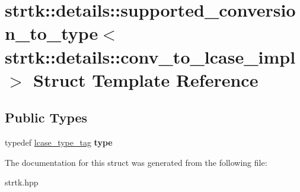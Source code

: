 \hypertarget{structstrtk_1_1details_1_1supported__conversion__to__type_3_01strtk_1_1details_1_1conv__to__lcase__impl_01_4}{\section{strtk\-:\-:details\-:\-:supported\-\_\-conversion\-\_\-to\-\_\-type$<$ strtk\-:\-:details\-:\-:conv\-\_\-to\-\_\-lcase\-\_\-impl $>$ Struct Template Reference}
\label{structstrtk_1_1details_1_1supported__conversion__to__type_3_01strtk_1_1details_1_1conv__to__lcase__impl_01_4}
}
\subsection*{Public Types}
\begin{DoxyCompactItemize}
\item 
\hypertarget{structstrtk_1_1details_1_1supported__conversion__to__type_3_01strtk_1_1details_1_1conv__to__lcase__impl_01_4_acaa692d89cd7a7390ab5a4c7a7648368}{typedef \hyperlink{structstrtk_1_1details_1_1lcase__type__tag}{lcase\-\_\-type\-\_\-tag} {\bfseries type}}\label{structstrtk_1_1details_1_1supported__conversion__to__type_3_01strtk_1_1details_1_1conv__to__lcase__impl_01_4_acaa692d89cd7a7390ab5a4c7a7648368}

\end{DoxyCompactItemize}


The documentation for this struct was generated from the following file\-:\begin{DoxyCompactItemize}
\item 
strtk.\-hpp\end{DoxyCompactItemize}
